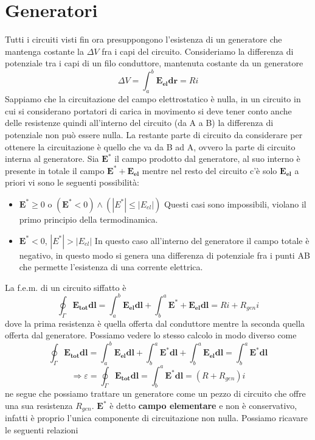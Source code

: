 \documentclass[10pt,a4paper]{article}
\begin{document}
\section{Generatori}
Tutti i circuiti visti fin ora presuppongono l'esistenza di un generatore che mantenga costante la \(\Delta V\) fra i capi del circuito. Consideriamo la differenza di potenziale tra i capi di un filo conduttore, mantenuta costante da un generatore
\[\Delta V = \int_a^b \mathbf{E_{el}}\mathbf{dr}= Ri\]
Sappiamo che la circuitazione del campo elettrostatico è nulla, in un circuito in cui si considerano portatori di carica in movimento si deve tener conto anche delle resistenze quindi all'interno del circuito (da A a B) la differenza di potenziale non può essere nulla. La restante parte di circuito da considerare per ottenere la circuitazione è quello che va da B ad A, ovvero la parte di circuito interna al generatore. Sia \(\mathbf{E^*}\) il campo prodotto dal generatore, al suo interno è presente in totale il campo \(\mathbf{E^*}+\mathbf{E_{el}}\) mentre nel resto del circuito c'è solo \(\mathbf{E_{el}}\) a priori vi sono le seguenti possibilità:
\begin{itemize}
	\item \(\mathbf{E^*} \geq 0\) o \((\mathbf{E^*} < 0) \wedge (|{E^*}| \leq |{E_{el}}|)\) Questi casi sono impossibili, violano il primo principio della termodinamica.
	\item \(\mathbf{E^*} < 0\),  \(|{E^*}| > |{E_{el}}|\) In questo caso all'interno del generatore il campo totale è negativo, in questo modo si genera una differenza di potenziale fra i punti AB che permette l'esistenza di una corrente elettrica. 
\end{itemize}
La f.e.m. di un circuito siffatto è 
\[\oint_{\Gamma}\mathbf{E_{tot}}\mathbf{dl}= \int_{a}^{b}\mathbf{E_{el}}\mathbf{dl}+\int_{b}^{a}\mathbf{E^*}+\mathbf{E_{el}}\mathbf{dl}= Ri + R_{gen}i\]
dove la prima resistenza è quella offerta dal conduttore mentre la seconda quella offerta dal generatore. Possiamo vedere lo stesso calcolo in modo diverso come
\[\oint_{\Gamma}\mathbf{E_{tot}}\mathbf{dl}= \int_{a}^{b}\mathbf{E_{el}}\mathbf{dl} + \int_{b}^{a}\mathbf{E^*}\mathbf{dl} +  \int_{b}^{a}\mathbf{E_{el}}\mathbf{dl}= \int_{b}^{a}\mathbf{E^*}\mathbf{dl}\]
\[\Rightarrow \varepsilon = \oint_{\Gamma}\mathbf{E_{tot}}\mathbf{dl} = \int_{b}^{a}\mathbf{E^*}\mathbf{dl} = (R + R_{gen})i \]
ne segue che possiamo trattare un generatore come un pezzo di circuito che offre una sua resistenza \(R_{gen}\). \(\mathbf{E^*}\) è detto \textbf{campo elementare} e non è conservativo, infatti è proprio l'unica componente di circuitazione non nulla. Possiamo ricavare le seguenti relazioni
\end{document}
